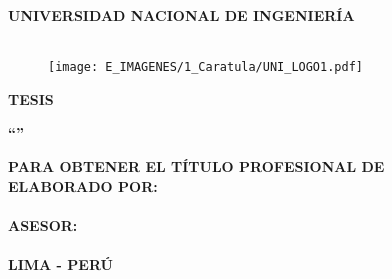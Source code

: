 \begin{titlepage}
	
	\begin{center}
		\vspace*{2 mm}
		{\LARGE \textbf{UNIVERSIDAD NACIONAL DE INGENIERÍA}}\\
		\vspace{5 mm}
		{\Large \textbf{\@facultad}}\\
		\vspace{5.5 mm}
		\begin{figure}[h]
			\centering 
			\texttt{[image: E\_IMAGENES/1\_Caratula/UNI\_LOGO1.pdf]}
		\end{figure}
		\vspace{1 mm}	
		{\Large \textbf{TESIS} }\\
		\vspace{4 mm}
		
		\onehalfspacing  %
		{\Large \textbf{``{\@titlecaratula}''} }\\
		
		\singlespacing  %
		
		\vspace{5 mm}	
		{\large \textbf{PARA OBTENER EL TÍTULO PROFESIONAL DE {\@grado} } }\\
		\vspace{10 mm}
		{\large \textbf{ELABORADO POR:} }\\
		\vspace{4 mm}	
		{\large \textbf{\@authorcaratula} }\\
		\vspace{10 mm}
		{\large \textbf{ASESOR:} }\\
		\vspace{4 mm}	
		{\large \textbf{\@asesor} }\\
		\vspace{10 mm}	
		{\large \textbf{LIMA - PERÚ} }\\
		\vspace{4 mm}	
		{\large \textbf{\@yyearr} }\\

	\end{center}

\end{titlepage}
